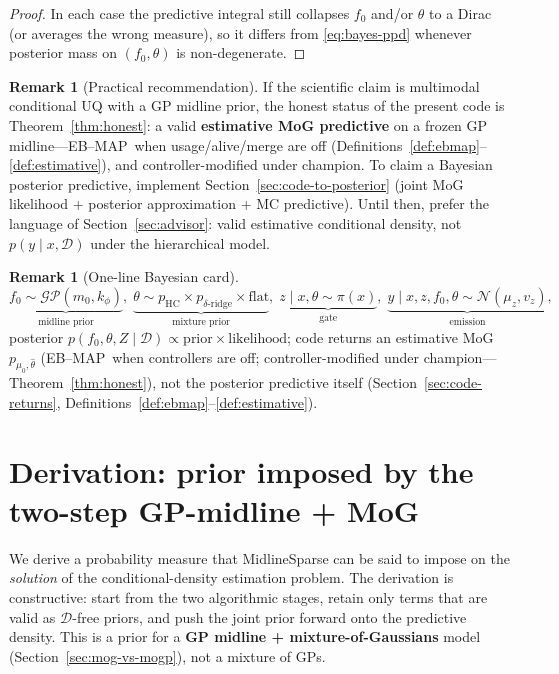 \documentclass[11pt,a4paper]{article}
\theoremstyle{plain}
\theoremstyle{definition}
\newtheorem{remark}[theorem]{Remark}
\theoremstyle{remark}
\newcommand{\Ncal}{\mathcal{N}}
\newcommand{\GP}{\mathcal{GP}}
\newcommand{\D}{\mathcal{D}}
\newcommand{\tht}{\theta}
\newcommand{\EBMAP}{EB--MAP}
\begin{document}
\begin{proof}
In each case the predictive integral still collapses \(f_0\) and/or \(\tht\) to a
Dirac (or averages the wrong measure), so it differs from \eqref{eq:bayes-ppd}
whenever posterior mass on \((f_0,\tht)\) is non-degenerate.
\end{proof}

\begin{remark}[Practical recommendation]
If the scientific claim is multimodal conditional UQ with a GP midline prior, the
honest status of the present code is Theorem~\ref{thm:honest}: a valid
\textbf{estimative MoG predictive} on a frozen GP midline---\EBMAP\ when
usage/alive/merge are off (Definitions~\ref{def:ebmap}--\ref{def:estimative}), and
controller-modified under champion.
To claim a Bayesian posterior predictive, implement
Section~\ref{sec:code-to-posterior} (joint MoG likelihood + posterior approximation +
MC predictive). Until then, prefer the language of Section~\ref{sec:advisor}: valid
estimative conditional density, not \(p(y\mid x,\D)\) under the hierarchical model.
\end{remark}

\begin{remark}[One-line Bayesian card]
\[
  \underbrace{f_0\sim\GP(m_0,k_\phi)}_{\text{midline prior}},
  \;
  \underbrace{\tht\sim p_{\mathrm{HC}}\times p_{\delta\text{-ridge}}\times\mathrm{flat}}_{\text{mixture prior}},
  \;
  \underbrace{z\mid x,\tht\sim\pi(x)}_{\text{gate}},
  \;
  \underbrace{y\mid x,z,f_0,\tht\sim\Ncal(\mu_z,v_z)}_{\text{emission}},
\]
posterior \(p(f_0,\tht,Z\mid\D)\propto\text{prior}\times\text{likelihood}\); code returns
an estimative MoG \(p_{\mu_0,\hat\tht}\) (\EBMAP\ when controllers are off;
controller-modified under champion---Theorem~\ref{thm:honest}), not the posterior
predictive itself
(Section~\ref{sec:code-returns}, Definitions~\ref{def:ebmap}--\ref{def:estimative}).
\end{remark}

\section{Derivation: prior imposed by the two-step GP-midline + MoG}
\label{sec:derive-prior}

We derive a probability measure that MidlineSparse can be said to impose on the
\emph{solution} of the conditional-density estimation problem. The derivation is
constructive: start from the two algorithmic stages, retain only terms that are
valid as \(\D\)-free priors, and push the joint prior forward onto the predictive
density.
This is a prior for a \textbf{GP midline + mixture-of-Gaussians} model
(Section~\ref{sec:mog-vs-mogp}), not a mixture of GPs.
\end{document}
